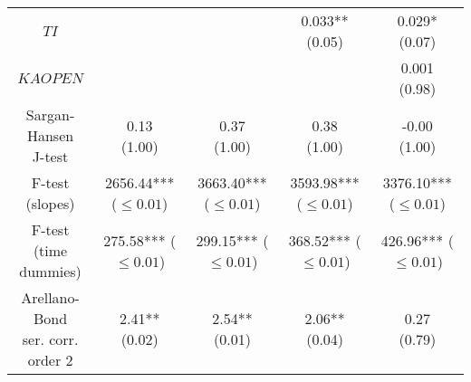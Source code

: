 \begin{tabular}{ccccc}
                                          $TI$ &                                       &                                       &            \makecell{0.033**\\(0.05)} &             \makecell{0.029*\\(0.07)} \\
                                      $KAOPEN$ &                                       &                                       &                                       &              \makecell{0.001\\(0.98)} \\
              \makecell{Sargan-Hansen\\J-test} &               \makecell{0.13\\(1.00)} &               \makecell{0.37\\(1.00)} &               \makecell{0.38\\(1.00)} &              \makecell{-0.00\\(1.00)} \\
                   \makecell{F-test\\(slopes)} &  \makecell{2656.44***\\($\leq 0.01$)} &  \makecell{3663.40***\\($\leq 0.01$)} &  \makecell{3593.98***\\($\leq 0.01$)} &  \makecell{3376.10***\\($\leq 0.01$)} \\
             \makecell{F-test\\(time dummies)} &   \makecell{275.58***\\($\leq 0.01$)} &   \makecell{299.15***\\($\leq 0.01$)} &   \makecell{368.52***\\($\leq 0.01$)} &   \makecell{426.96***\\($\leq 0.01$)} \\
 \makecell{Arellano-Bond\\ser. corr.  order 2} &             \makecell{2.41**\\(0.02)} &             \makecell{2.54**\\(0.01)} &             \makecell{2.06**\\(0.04)} &               \makecell{0.27\\(0.79)} \\
\bottomrule
\end{tabular}
